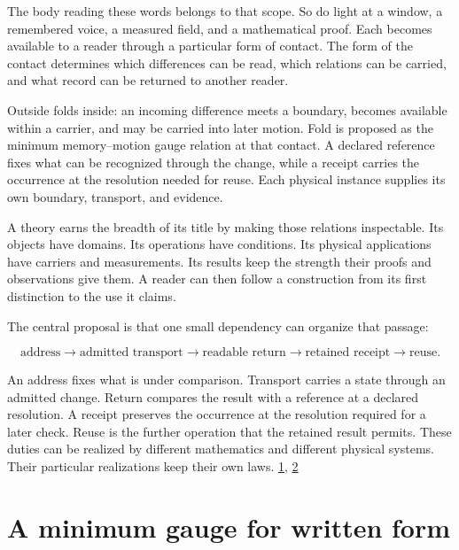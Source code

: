 The body reading these words belongs to that scope. So do light at a window, a remembered voice, a measured field, and a mathematical proof. Each becomes available to a reader through a particular form of contact. The form of the contact determines which differences can be read, which relations can be carried, and what record can be returned to another reader.

Outside folds inside: an incoming difference meets a boundary, becomes available within a carrier, and may be carried into later motion. Fold is proposed as the minimum memory--motion gauge relation at that contact. A declared reference fixes what can be recognized through the change, while a receipt carries the occurrence at the resolution needed for reuse. Each physical instance supplies its own boundary, transport, and evidence.

A theory earns the breadth of its title by making those relations inspectable. Its objects have domains. Its operations have conditions. Its physical applications have carriers and measurements. Its results keep the strength their proofs and observations give them. A reader can then follow a construction from its first distinction to the use it claims.

The central proposal is that one small dependency can organize that passage:

\[
\text{address}\longrightarrow
\text{admitted transport}\longrightarrow
\text{readable return}\longrightarrow
\text{retained receipt}\longrightarrow
\text{reuse}.
\tag{1}
\]

An address fixes what is under comparison. Transport carries a state through an admitted change. Return compares the result with a reference at a declared resolution. A receipt preserves the occurrence at the resolution required for a later check. Reuse is the further operation that the retained result permits. These duties can be realized by different mathematics and different physical systems. Their particular realizations keep their own laws. \href{https://github.com/Coppalini-Architecture/coppalini-architecture/blob/9b7122ca5c3712c2c294e2bc5097276d0ba9817b/papers/language-mechanics/000-language-mechanics/language-mechanics-000-v0.2.1.pdf}{1}, \href{https://doi.org/10.5281/zenodo.23697265}{2}

\hypertarget{a-minimum-gauge-for-written-form}{%
\section{A minimum gauge for written form}\label{a-minimum-gauge-for-written-form}}

